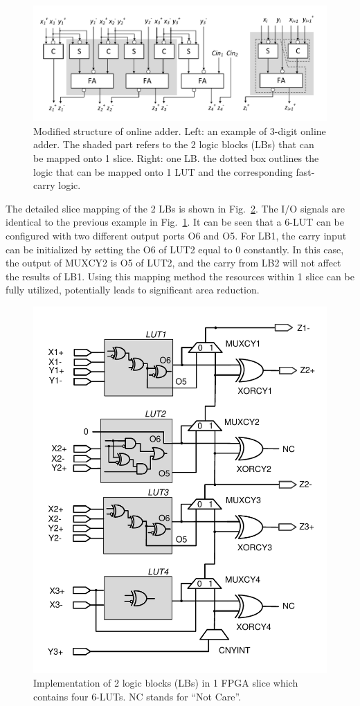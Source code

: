 \documentclass[conference]{IEEEtran}
\begin{document}
\begin{figure}[tbp]
	\centering
	\includegraphics[width=.5\textwidth]{./Figures/SDadder_FPGA_New.pdf}
	\caption{Modified structure of online adder. Left: an example of 3-digit online adder. The shaded part refers to the 2 logic blocks (LBs) that can be mapped onto 1 slice. Right: one LB. the dotted box outlines the logic that can be mapped onto 1 LUT and the corresponding fast-carry logic.}
	\label{Fig:ModifiedOA}
\end{figure}

The detailed slice mapping of the 2 LBs is shown in Fig.~\ref{Fig:SliceNew}. The I/O signals are identical to the previous example in Fig.~\ref{Fig:ModifiedOA}. It can be seen that a 6-LUT can be configured with two different output ports O6 and O5. For LB1, the carry input can be initialized by setting the O6 of LUT2 equal to 0 constantly. In this case, the output of MUXCY2 is O5 of LUT2, and the carry from LB2 will not affect the results of LB1. Using this mapping method the resources within 1 slice can be fully utilized, potentially leads to significant area reduction.  

\begin{figure}[tbp]
	\centering
	\includegraphics[width=.48\textwidth]{./Figures/SDadder_FastCarry_New.pdf}
	\caption{Implementation of 2 logic blocks (LBs) in 1 FPGA slice which contains four 6-LUTs. NC stands for ``Not Care''.}
	\label{Fig:SliceNew}
\end{figure}
\end{document}
